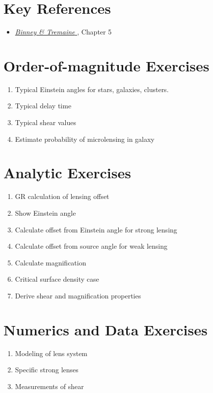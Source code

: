 \section{Key References}

\begin{itemize}
  \item
    \href{http://adsabs.harvard.edu/abs/2000asqu.book.....C}{
    {\it Binney \& Tremaine}
      \citet{cox00a}}, Chapter 5
\end{itemize}

\section{Order-of-magnitude Exercises}

\begin{enumerate} 
\item Typical Einstein angles for stars, galaxies, clusters.
\item Typical delay time
\item Typical shear values
\item Estimate probability of microlensing in galaxy
\end{enumerate}   

\section{Analytic Exercises}

\begin{enumerate}
\item GR calculation of lensing offset
\item Show Einstein angle
\item Calculate offset from Einstein angle for strong lensing
\item Calculate offset from source angle for weak lensing
\item Calculate magnification
\item Critical surface density case
\item Derive shear and magnification properties
\end{enumerate}

\section{Numerics and Data Exercises}

\begin{enumerate}
\item Modeling of lens system
\item Specific strong lenses
\item Measurements of shear
\end{enumerate}


  
